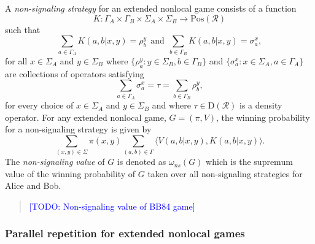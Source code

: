 \documentclass[nofootinbib,superscriptaddress,a4paper,twocolumn,longbibliography,floatfix,pra]{revtex4-2}
\newcommand{\comment}[1]{\begin{quote}\sf 
    \textcolor{blue}{[#1]}\end{quote}}
\renewcommand{\ip}[2]{\langle #1 , #2\rangle}
\newcommand{\setft}[1]{\mathrm{#1}}
\newcommand{\Density}{\setft{D}}
\newcommand{\Pos}{\setft{Pos}}
\newcommand{\R}{\mathcal{R}}
\begin{document}
A \emph{non-signaling strategy} for an extended nonlocal game consists of a
function
\begin{equation}
    K : \Gamma_A \times \Gamma_B \times \Sigma_A \times \Sigma_B \rightarrow
    \Pos(\R)
\end{equation}
such that
\begin{equation*}
    \sum_{a \in \Gamma_A} K(a,b|x,y) = \rho_b^y 
    \ \ \text{and} \ \
    \sum_{b \in \Gamma_B} K(a,b|x,y) = \sigma_a^x,
\end{equation*}
for all $x \in \Sigma_A$ and $y \in \Sigma_B$ where $\{\rho_a^y : y \in
\Sigma_B, b \in \Gamma_B\}$ and $\{\sigma_a^x : x \in \Sigma_A, a \in
\Gamma_A\}$ are collections of operators satisfying
\begin{equation}
    \sum_{a \in \Gamma_A} \sigma_a^x = 
    \tau = 
    \sum_{b \in \Gamma_B} \rho_b^y,
\end{equation}
for every choice of $x \in \Sigma_A$ and $y \in \Sigma_B$ and where $\tau \in
\Density(\R)$ is a density operator. For any extended nonlocal game, $G = (\pi,
V)$, the winning probability for a non-signaling strategy is given by
\begin{equation}
    \sum_{(x,y) \in \Sigma} \pi(x,y) \sum_{(a,b) \in \Gamma}
    \ip{V(a,b|x,y)}{K(a,b|x,y)}.
\end{equation}
The \emph{non-signaling value} of $G$ is denoted as $\omega_{ns}(G)$ which is
the supremum value of the winning probability of $G$ taken over all
non-signaling strategies for Alice and Bob.

\comment{TODO: Non-signaling value of BB84 game}


\subsubsection{Parallel repetition for extended nonlocal games}
\label{}
\end{document}
